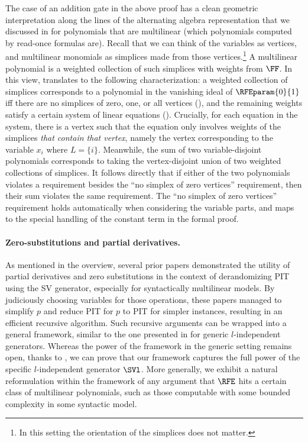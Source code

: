 \documentclass{toc}
\begin{document}
The case of an addition gate in the above proof has a clean geometric interpretation along the lines of the alternating algebra representation that we discussed in  for polynomials that are multilinear (which polynomials computed by read-once formulas are).  Recall that we can think of the variables as vertices, and multilinear monomials as simplices made from those vertices.\footnote{In this setting the orientation of the simplices does not matter.} A multilinear polynomial is a weighted collection of such simplices with weights from \(\FF\).
In this view,  translates to the following characterization: a weighted collection of simplices corresponds to a polynomial in the vanishing ideal of \(\RFEparam{0}{1}\) iff there are no simplices of zero, one, or all vertices (), and the remaining weights satisfy a certain system of linear equations (). 
Crucially, for each equation in the system, there is a vertex such that the equation only involves weights of the simplices \emph{that contain that vertex}, namely the vertex corresponding to the variable $x_i$ where $L = \{i\}$. 
Meanwhile, the sum of two variable-disjoint polynomials corresponds to taking the vertex-disjoint union of two weighted collections of simplices.
It follows directly that if either of the two polynomials violates a requirement besides the ``no simplex of zero vertices'' requirement, then their sum violates the same requirement. The ``no simplex of zero vertices'' requirement holds automatically when considering the variable parts, and maps to the special handling of the constant term in the formal proof. 

\paragraph{Zero-substitutions and partial derivatives.}
As mentioned in the overview,
several prior papers demonstrated the utility of partial derivatives and zero
substitutions in the context of derandomizing PIT using the SV generator,
especially for syntactically multilinear models.
By judiciously choosing variables for those operations,
these papers managed to simplify $p$ and reduce PIT for $p$ to PIT for simpler
instances, resulting in an efficient recursive algorithm.
Such recursive arguments can be wrapped into a general framework, similar to the one presented in \cite{MediniShpilka2021} for generic $l$-independent generators. Whereas the power of the framework in the generic setting remains open, thanks to , we can prove that our framework captures the full power of the specific $l$-independent generator $\SVl$. More generally, we exhibit a natural reformulation within the framework of any argument that $\RFE$ hits a certain class of multilinear polynomials, such as those computable with some bounded complexity in some syntactic model.
\end{document}
